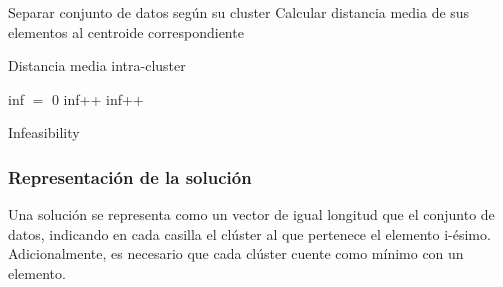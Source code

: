 \vspace{\baselineskip}

\begin{algorithm}[H]
    \SetAlgoLined
        Separar conjunto de datos según su cluster \;
         {
            Calcular distancia media de sus elementos al centroide correspondiente \;
        }        
    \caption{Distancia media intra-cluster}
\end{algorithm}

\vspace{\baselineskip}

\begin{algorithm}[H]
    \SetAlgoLined
        inf $=$ 0 \;
         {
             {
                inf++ \;
            }            
             {
                    inf++ \;
            }
        }
    \caption{Infeasibility}
\end{algorithm}

\subsubsection{Representación de la solución}

Una solución se representa como un vector de igual longitud que el conjunto de datos, indicando en cada casilla el clúster al que pertenece el elemento i-ésimo. Adicionalmente, es necesario que cada clúster cuente como mínimo con un elemento.